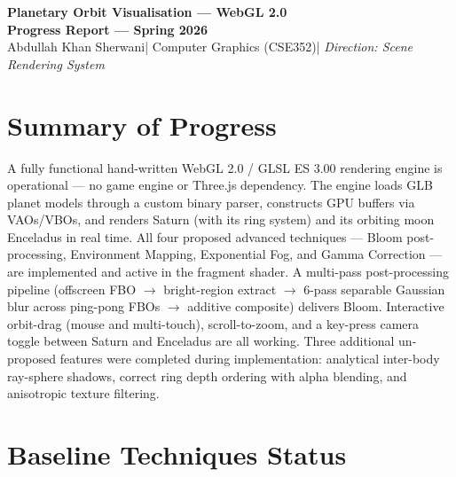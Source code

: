 \documentclass[11pt,a4paper]{article}
\begin{document}
\begin{center}
  {\Large\bfseries Planetary Orbit Visualisation --- WebGL 2.0}\\[3pt]
  {\large\bfseries Progress Report --- Spring 2026}\\[3pt]
  Abdullah Khan Sherwani\quad|\quad
  Computer Graphics (CSE352)\quad|\quad
  \textit{Direction: Scene Rendering System}
\end{center}

\vspace{2pt}
\section{Summary of Progress}

A fully functional hand-written WebGL 2.0 / GLSL ES 3.00 rendering engine is
operational --- no game engine or Three.js dependency.
The engine loads GLB planet models through a custom binary parser, constructs
GPU buffers via VAOs/VBOs, and renders Saturn (with its ring system) and its
orbiting moon Enceladus in real time.
All four proposed advanced techniques --- Bloom post-processing, Environment
Mapping, Exponential Fog, and Gamma Correction --- are implemented and active in
the fragment shader.
A multi-pass post-processing pipeline (offscreen FBO $\to$ bright-region extract
$\to$ 6-pass separable Gaussian blur across ping-pong FBOs $\to$ additive
composite) delivers Bloom.
Interactive orbit-drag (mouse and multi-touch), scroll-to-zoom, and a key-press
camera toggle between Saturn and Enceladus are all working.
Three additional un-proposed features were completed during implementation:
analytical inter-body ray-sphere shadows, correct ring depth ordering with alpha
blending, and anisotropic texture filtering.

\section{Baseline Techniques Status}
\end{document}
